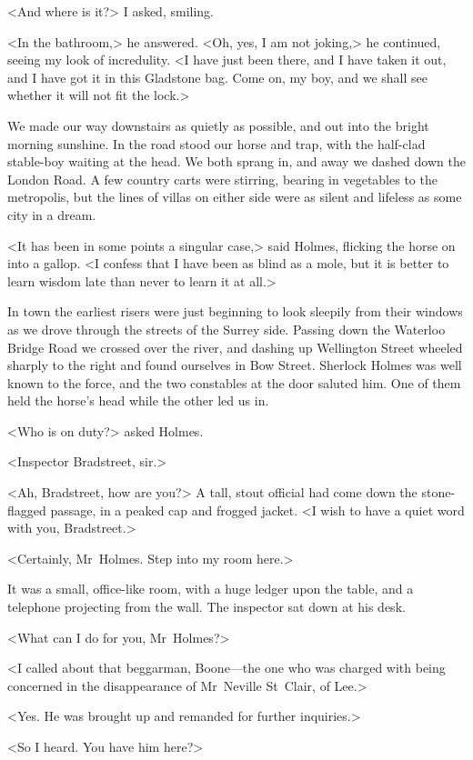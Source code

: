 <And where is it?> I asked, smiling.

<In the bathroom,> he answered. <Oh, yes, I am not joking,> he continued, seeing my look of incredulity. <I have just been there, and I have taken it out, and I have got it in this Gladstone bag. Come on, my boy, and we shall see whether it will not fit the lock.>

We made our way downstairs as quietly as possible, and out into the bright morning sunshine. In the road stood our horse and trap, with the half-clad stable-boy waiting at the head. We both sprang in, and away we dashed down the London Road. A few country carts were stirring, bearing in vegetables to the metropolis, but the lines of villas on either side were as silent and lifeless as some city in a dream.

<It has been in some points a singular case,> said Holmes, flicking the horse on into a gallop. <I confess that I have been as blind as a mole, but it is better to learn wisdom late than never to learn it at all.>

In town the earliest risers were just beginning to look sleepily from their windows as we drove through the streets of the Surrey side. Passing down the Waterloo Bridge Road we crossed over the river, and dashing up Wellington Street wheeled sharply to the right and found ourselves in Bow Street. Sherlock Holmes was well known to the force, and the two constables at the door saluted him. One of them held the horse's head while the other led us in.

<Who is on duty?> asked Holmes.

<Inspector Bradstreet, sir.>

<Ah, Bradstreet, how are you?> A tall, stout official had come down the stone-flagged passage, in a peaked cap and frogged jacket. <I wish to have a quiet word with you, Bradstreet.>

<Certainly, Mr~Holmes. Step into my room here.>

It was a small, office-like room, with a huge ledger upon the table, and a telephone projecting from the wall. The inspector sat down at his desk.

<What can I do for you, Mr~Holmes?>

<I called about that beggarman, Boone—the one who was charged with being concerned in the disappearance of Mr~Neville St~Clair, of Lee.>

<Yes. He was brought up and remanded for further inquiries.>

<So I heard. You have him here?>

